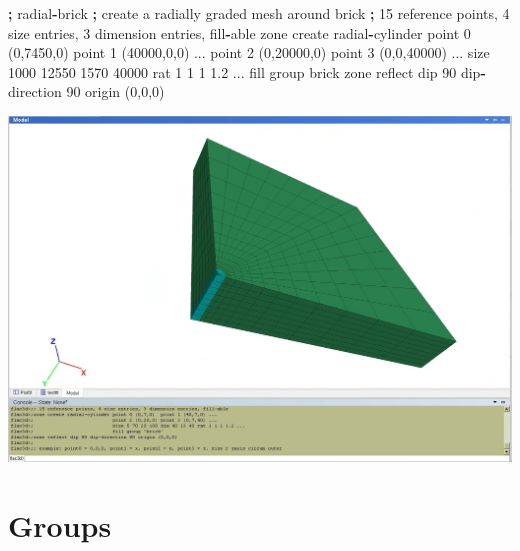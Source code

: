 \documentclass[a4paper, nobind]{templates/ociamthesis}
\newenvironment{Shaded}{\begin{snugshade}}{\end{snugshade}}
\newcommand{\DecValTok}[1]{\textcolor[rgb]{0.00,0.00,0.81}{#1}}
\newcommand{\FloatTok}[1]{\textcolor[rgb]{0.00,0.00,0.81}{#1}}
\newcommand{\NormalTok}[1]{#1}
\newcommand{\OperatorTok}[1]{\textcolor[rgb]{0.81,0.36,0.00}{\textbf{#1}}}
\newcommand{\StringTok}[1]{\textcolor[rgb]{0.31,0.60,0.02}{#1}}
\renewenvironment{Shaded}
{
  \vspace{10pt}%
  \begin{snugshade}%
}{%
  \end{snugshade}%
  \vspace{8pt}%
}
\begin{document}
\begin{Shaded}
\begin{Highlighting}[]
\OperatorTok{;}\NormalTok{ radial}\OperatorTok{{-}}\NormalTok{brick}
\OperatorTok{;}\NormalTok{ create a radially graded mesh around brick}
\OperatorTok{;} \DecValTok{15}\NormalTok{ reference points, }\DecValTok{4}\NormalTok{ size entries, }\DecValTok{3}\NormalTok{ dimension entries, fill}\OperatorTok{{-}}\NormalTok{able}
\NormalTok{zone create radial}\OperatorTok{{-}}\NormalTok{cylinder point }\DecValTok{0}\NormalTok{ (}\DecValTok{0}\NormalTok{,}\DecValTok{7450}\NormalTok{,}\DecValTok{0}\NormalTok{)  point }\DecValTok{1}\NormalTok{ (}\DecValTok{40000}\NormalTok{,}\DecValTok{0}\NormalTok{,}\DecValTok{0}\NormalTok{) ...}
\NormalTok{                            point }\DecValTok{2}\NormalTok{ (}\DecValTok{0}\NormalTok{,}\DecValTok{20000}\NormalTok{,}\DecValTok{0}\NormalTok{) point }\DecValTok{3}\NormalTok{ (}\DecValTok{0}\NormalTok{,}\DecValTok{0}\NormalTok{,}\DecValTok{40000}\NormalTok{) ...}
\NormalTok{                            size }\DecValTok{1000} \DecValTok{12550} \DecValTok{1570} \DecValTok{40000}\NormalTok{ rat }\DecValTok{1} \DecValTok{1} \DecValTok{1} \FloatTok{1.2}\NormalTok{ ...}
\NormalTok{                            fill group }\StringTok{\textquotesingle{}brick\textquotesingle{}}
\NormalTok{zone reflect dip }\DecValTok{90}\NormalTok{ dip}\OperatorTok{{-}}\NormalTok{direction }\DecValTok{90}\NormalTok{ origin (}\DecValTok{0}\NormalTok{,}\DecValTok{0}\NormalTok{,}\DecValTok{0}\NormalTok{)}
\end{Highlighting}
\end{Shaded}

\includegraphics[width=1\linewidth]{myfigureeeeee/radialbrick}

\hypertarget{groups}{%
\section{Groups}\label{groups}}
\end{document}
